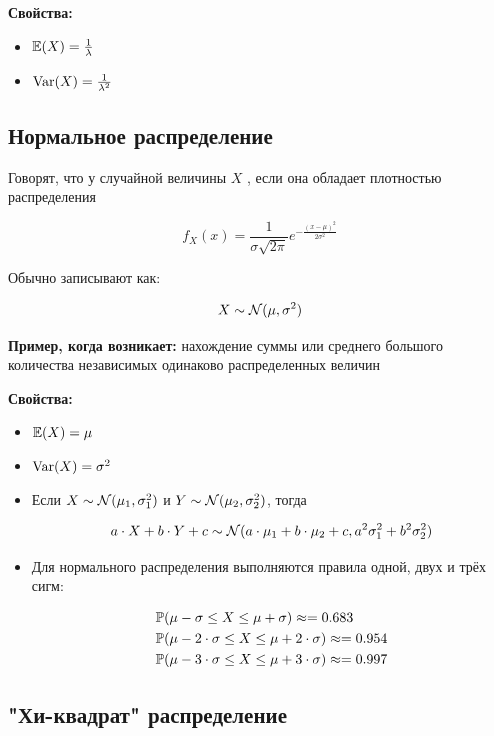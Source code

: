 \documentclass[12pt, a4paper, oneside]{article}
\begin{document}
\textbf{Свойства:}

\begin{itemize} 
\item $\mathbb{E}(X) = \frac{1}{\lambda}$
\item $\operatorname{Var}(X) = \frac{1}{\lambda^2}$
\end{itemize} 

\subsection*{Нормальное распределение}

Говорят, что у случайной величины $X$ , если она обладает плотностью распределения

$$
f_{X}(x) = \frac{1}{\sigma \sqrt{2 \pi}} e^{-\tfrac{(x - \mu)^2}{2\sigma^2}}
$$

Обычно записывают как:

$$
X \sim \mathcal{N}(\mu, \sigma^2)
$$

\textbf{Пример, когда возникает:} нахождение суммы или среднего большого количества независимых одинаково распределенных величин

\textbf{Свойства:}

\begin{itemize} 
\item $\mathbb{E}(X) = \mu$
\item $\operatorname{Var}(X) = \sigma^2$
\item Если $X \sim \mathcal{N}(\mu_1, \sigma_1^2)$ и $Y \sim \mathcal{N}(\mu_2, \sigma_2^2)$, тогда 

$$
a\cdot X + b \cdot Y + c \sim \mathcal{N}(a\cdot \mu_1 + b \cdot \mu_2 + c, a^2 \sigma_1^2 + b^2 \sigma_2^2) 
$$

\item Для нормального распределения выполняются правила одной, двух и трёх сигм: 

\begin{equation*}
\begin{aligned}
& \mathbb{P}(\mu - \sigma \le X \le \mu + \sigma) \approx = 0.683 \\
& \mathbb{P}(\mu - 2\cdot \sigma \le X \le \mu + 2 \cdot \sigma) \approx = 0.954 \\
& \mathbb{P}(\mu - 3 \cdot \sigma \le X \le \mu + 3 \cdot \sigma) \approx = 0.997
\end{aligned}
\end{equation*}
\end{itemize} 


\subsection*{"Хи-квадрат" распределение}
\end{document}
